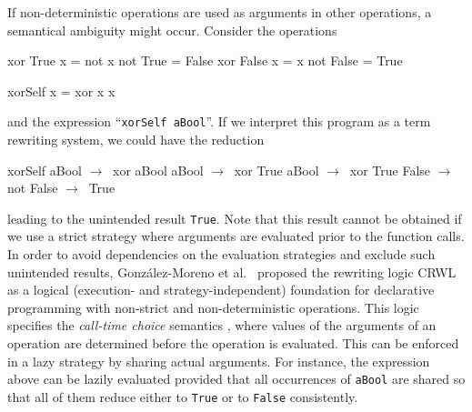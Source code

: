 \documentclass{llncs}
\newcommand{\code}[1]{\mbox{\small\texttt{#1}}}
\newcommand{\ccode}[1]{``\code{#1}''}
\begin{document}
If non-deterministic operations are used as arguments in other operations,
a semantical ambiguity might occur. Consider the operations
%
\begin{curry}
  xor True  x = not x             not True  = False
  xor False x = x                 not False = True

  xorSelf x = xor x x
\end{curry}
%
and the expression \ccode{xorSelf aBool}.
If we interpret this program as a term rewriting system,
we could have the reduction
\begin{haskell}
  xorSelf aBool  $\to~$  xor aBool aBool     $\to~$  xor True aBool
                 $\to~$  xor True False      $\to~$  not False        $\to~$ True
\end{haskell}
leading to the unintended result \code{True}.
Note that this result cannot be obtained if we use a strict strategy
where arguments are evaluated prior to the function calls.
In order to avoid dependencies on the evaluation strategies
and exclude such unintended results,
Gonz\'alez-Moreno et al.\ \cite{GonzalezEtAl99} proposed
the rewriting logic CRWL as a logical
(execution- and strategy-independent) foundation for declarative
programming with non-strict and non-deterministic operations.  This
logic specifies the \emph{call-time choice} semantics \cite{Hussmann92}
\label{ctc-semantics},
where values of the arguments of an operation are determined before the
operation is evaluated. This can be enforced in a lazy strategy
by sharing actual arguments.
For instance, the expression above can be lazily evaluated
provided that all occurrences of \code{aBool}
are shared so that all of them reduce either to \code{True} or to \code{False}
consistently.
\end{document}
